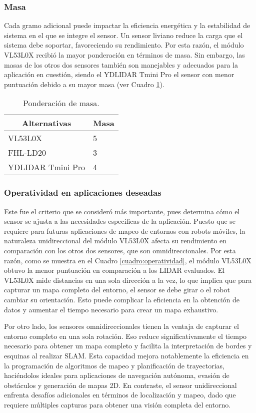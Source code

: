 \subsubsection{Masa}
Cada gramo adicional puede impactar la eficiencia energética y la estabilidad de sistema en el que se integre el sensor. Un sensor liviano reduce la carga que el sistema debe soportar, favoreciendo su rendimiento. Por esta razón, el módulo VL53L0X recibió la mayor ponderación en términos de masa. Sin embargo, las masas de los otros dos sensores también son manejables y adecuados para la aplicación en cuestión, siendo el YDLIDAR Tmini Pro el sensor con menor puntuación debido a su mayor masa (ver Cuadro \ref{cuadro:Masa}).

\begin{table}[H]
	\centering
	\begin{tabular}{|l|l|}
		\hline
		\multicolumn{1}{|c|}{\textbf{Alternativas}}&\multicolumn{1}{|c|}{\textbf{Masa}}\\ \hline
		VL53L0X&5\\ \hline
		FHL-LD20&3\\ \hline
		YDLIDAR Tmini Pro&4\\ \hline
	\end{tabular}
	\caption{Ponderación de masa.} 
	\label{cuadro:Masa}
\end{table}

\subsubsection{Operatividad en aplicaciones deseadas}
Este fue el criterio que se consideró más importante, pues determina cómo el sensor se ajusta a las necesidades específicas de la aplicación. Puesto que se requiere para futuras aplicaciones de mapeo de entornos con robots móviles, la naturaleza unidireccional del módulo VL53L0X afecta su rendimiento en comparación con los otros dos sensores, que son omnidireccionales. Por esta razón, como se muestra en el Cuadro \ref{cuadro:operatividad}, el módulo VL53L0X obtuvo la menor puntuación en comparación a los LIDAR evaluados. El VL53L0X mide distancias en una sola dirección a la vez, lo que implica que para capturar un mapa completo del entorno, el sensor se debe girar o el robot cambiar su orientación. Esto puede complicar la eficiencia en la obtención de datos y aumentar el tiempo necesario para crear un mapa exhaustivo. 

Por otro lado, los sensores omnidireccionales tienen la ventaja de capturar el entorno completo en una sola rotación. Eso reduce significativamente el tiempo necesario para obtener un mapa completo y facilita la interpretación de bordes y esquinas al realizar SLAM. Esta capacidad mejora notablemente la eficiencia en la programación de algoritmos de mapeo y planificación de trayectorias, haciéndolos ideales para aplicaciones de navegación autónoma, evasión de obstáculos y generación de mapas 2D. En contraste, el sensor unidireccional enfrenta desafíos adicionales en términos de localización y mapeo, dado que requiere múltiples capturas para obtener una visión completa del entorno. 


